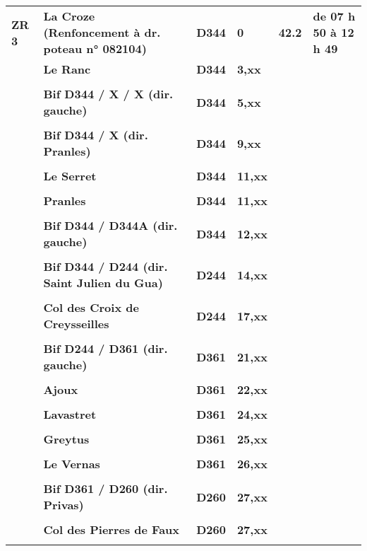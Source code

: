 \documentclass{article}%
\begin{document}
\begin{longtable}{p{2.25cm}|p{7.0cm}|p{1.5cm}|p{1.5cm}|p{1.5cm}|p{3.5cm}}
\textbf{ZR 3}&\textbf{La Croze (Renfoncement à dr. poteau n° 082104)}&\textbf{D344 }&\textbf{0}&\textbf{42.2}&\textbf{de 07 h 50 à 12 h 49}\\%
 &\textbf{Le Ranc}&\textbf{D344 }&\textbf{3,xx}& & \\%
 & & & & & \\%
 &\textbf{Bif D344 / X / X (dir. gauche)}&\textbf{D344 }&\textbf{5,xx}& & \\%
 & & & & & \\%
 &\textbf{Bif D344 / X (dir. Pranles)}&\textbf{D344 }&\textbf{9,xx}& & \\%
 & & & & & \\%
 &\textbf{Le Serret}&\textbf{D344 }&\textbf{11,xx}& & \\%
 & & & & & \\%
 &\textbf{Pranles}&\textbf{D344 }&\textbf{11,xx}& & \\%
 & & & & & \\%
 &\textbf{Bif D344 / D344A (dir. gauche)}&\textbf{D344 }&\textbf{12,xx}& & \\%
 & & & & & \\%
 &\textbf{Bif D344 / D244 (dir. Saint Julien du Gua)}&\textbf{D244 }&\textbf{14,xx}& & \\%
 & & & & & \\%
 &\textbf{Col des Croix de Creysseilles}&\textbf{D244 }&\textbf{17,xx}& & \\%
 & & & & & \\%
 &\textbf{Bif D244 / D361 (dir. gauche)}&\textbf{D361 }&\textbf{21,xx}& & \\%
 & & & & & \\%
 &\textbf{Ajoux}&\textbf{D361 }&\textbf{22,xx}& & \\%
 & & & & & \\%
 &\textbf{Lavastret }&\textbf{D361 }&\textbf{24,xx}& & \\%
 & & & & & \\%
 &\textbf{Greytus}&\textbf{D361 }&\textbf{25,xx}& & \\%
 & & & & & \\%
 &\textbf{Le Vernas}&\textbf{D361 }&\textbf{26,xx}& & \\%
 & & & & & \\%
 &\textbf{Bif D361 / D260 (dir. Privas)}&\textbf{D260}&\textbf{27,xx}& & \\%
 & & & & & \\%
 &\textbf{Col des Pierres de Faux}&\textbf{D260}&\textbf{27,xx}& & \\%
 & & & & & \\%

\end{longtable}
\end{document}
